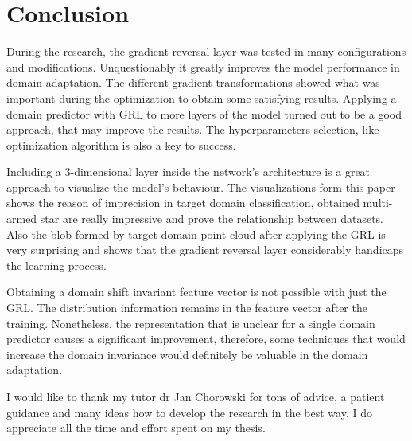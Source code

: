\documentclass[shortabstract, inz, english]{iithesis}
\begin{document}
\chapter{Conclusion}
During the research, the gradient reversal layer was tested in many configurations and modifications. Unquestionably it greatly improves the model performance in domain adaptation. The different gradient transformations showed what was important during the optimization to obtain some satisfying results. Applying a domain predictor with GRL to more layers of the model turned out to be a good approach, that may improve the results. The hyperparameters selection, like optimization algorithm is also a key to success.
\par
Including a 3-dimensional layer inside the network's architecture is a great approach to visualize the model's behaviour. The visualizations form this paper shows the reason of imprecision in target domain classification, obtained multi-armed star are really impressive and prove the relationship between datasets. Also the blob formed by target domain point cloud after applying the GRL is very surprising and shows that the gradient reversal layer considerably handicaps the learning process.
\par
Obtaining a domain shift invariant feature vector is not possible with just the GRL. The distribution information remains in the feature vector after the training. Nonetheless, the representation that is unclear for a single domain predictor causes a significant improvement, therefore, some techniques that would increase the domain invariance would definitely be valuable in the domain adaptation.
\par
I would like to thank my tutor dr Jan Chorowski for tons of advice, a patient guidance and many ideas how to develop the research in the best way. I do appreciate all the time and effort spent on my thesis.



\end{document}

